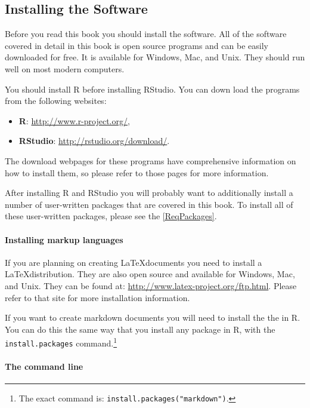 \documentclass[ChapterTOCs,krantz1]{krantz}\usepackage{graphicx, color}
\begin{document}
\subsection{Installing the Software}\label{InstallR}

Before you read this book you should install the software. All of the software covered in detail in this book is open source programs and can be easily downloaded for free. It is available for Windows, Mac, and Unix. They should run well on most modern computers. 

You should install R before installing RStudio. You can down load the programs from the following websites:

\begin{itemize}
    \item {\bf{R}}: \url{http://www.r-project.org/},
    \item {\bf{RStudio}}: \url{http://rstudio.org/download/}.
\end{itemize}

\noindent The download webpages for these programs have comprehensive information on how to install them, so please refer to those pages for more information.

After installing R and RStudio you will probably want to additionally install a number of user-written packages that are covered in this book. To install all of these user-written packages, please see the \ref{ReqPackages}.

\paragraph{Installing markup languages}

If you are planning on creating \LaTeX documents you need to install a \LaTeX distribution. They are also open source and available for Windows, Mac, and Unix. They can be found at: \url{http://www.latex-project.org/ftp.html}. Please refer to that site for more installation information.

If you want to create markdown documents you will need to install the the  in R. You can do this the same way that you install any package in R, with the {\tt{install.packages}} command.\footnote{The exact command is: {\tt{install.packages("markdown")}}.} 

\paragraph{The command line}
\end{document}
